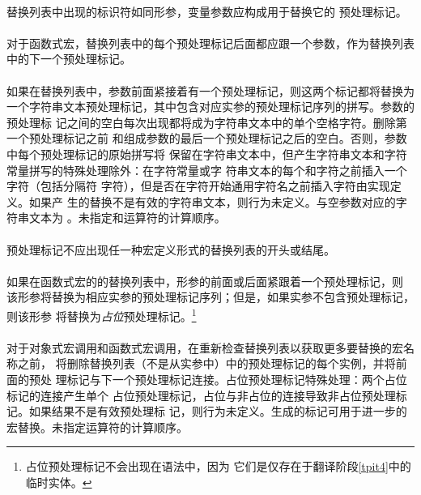{\paragraph{}
替换列表中出现的标识符如同形参，变量参数应构成用于替换它的
预处理标记。

\constraint
\paragraph{}
对于函数式宏，替换列表中的每个预处理标记\tm{\#}后面都应跟一个参数，作为替换列表
中的下一个预处理标记。

\semantic
\paragraph{}
如果在替换列表中，参数前面紧接着有一个\tm{\#}预处理标记，则这两个标记都将替换为
一个字符串文本预处理标记，其中包含对应实参的预处理标记序列的拼写。参数的预处理标
记之间的空白每次出现都将成为字符串文本中的单个空格字符。删除第一个预处理标记之前
和组成参数的最后一个预处理标记之后的空白。否则，参数中每个预处理标记的原始拼写将
保留在字符串文本中，但产生字符串文本和字符常量拼写的特殊处理除外：在字符常量或字
符串文本的每个\tm{\dq}和\tm{\bs}字符之前插入一个\tm{\bs}字符（包括分隔符\tm{\dq}
字符），但是否在\tm{\bs}字符开始通用字符名之前插入\tm{\bs}字符由实现定义。如果产
生的替换不是有效的字符串文本，则行为未定义。与空参数对应的字符串文本为
\tm{\dq\dq}。未指定\tm{\#}和\tm{\#\#}运算符的计算顺序。

\constraint
\paragraph{}
\tm{\#\#}预处理标记不应出现任一种宏定义形式的替换列表的开头或结尾。

\semantic
\paragraph{}
如果在函数式宏的的替换列表中，形参的前面或后面紧跟着一个\tm{\#\#}预处理标记，则
该形参将替换为相应实参的预处理标记序列；但是，如果实参不包含预处理标记，则该形参
将替换为\textit{占位}预处理标记。\footnote{占位预处理标记不会出现在语法中，因为
它们是仅存在于翻译阶段\ref{tpit4}中的临时实体。}

\paragraph{}
对于对象式宏调用和函数式宏调用，在重新检查替换列表以获取更多要替换的宏名称之前，
将删除替换列表（不是从实参中）中的\tm{\#\#}预处理标记的每个实例，并将前面的预处
理标记与下一个预处理标记连接。占位预处理标记特殊处理：两个占位标记的连接产生单个
占位预处理标记，占位与非占位的连接导致非占位预处理标记。如果结果不是有效预处理标
记，则行为未定义。生成的标记可用于进一步的宏替换。未指定运算符的计算顺序。

}
